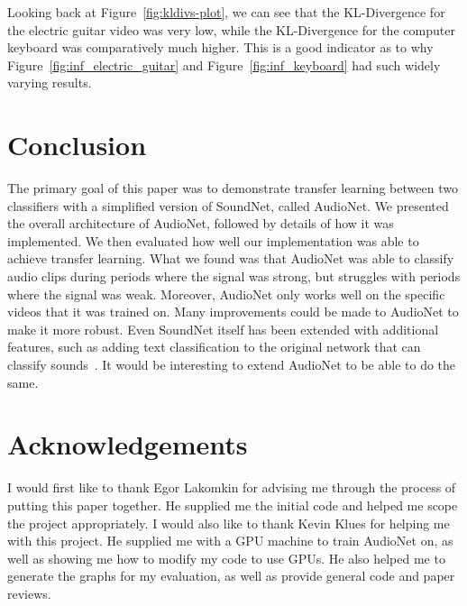 \documentclass[12pt,twoside]{article}
\theoremstyle{plain}
\theoremstyle{definition}
\theoremstyle{remark}
\begin{document}
Looking back at Figure~\ref{fig:kldivs-plot}, we can see that the KL-Divergence for the electric guitar video was very low, while the KL-Divergence for the computer keyboard was comparatively much higher.
This is a good indicator as to why Figure~\ref{fig:inf_electric_guitar} and Figure~\ref{fig:inf_keyboard} had such widely varying results.


\section{Conclusion}
\label{sec:conclusion}
The primary goal of this paper was to demonstrate transfer learning between two classifiers with a simplified version of SoundNet, called AudioNet.
We presented the overall architecture of AudioNet, followed by details of how it was implemented.
We then evaluated how well our implementation was able to achieve transfer learning.
What we found was that AudioNet was able to classify audio clips during periods where the signal was strong, but struggles with periods where the signal was weak.
Moreover, AudioNet only works well on the specific videos that it was trained on.
Many improvements could be made to AudioNet to make it more robust.
Even SoundNet itself has been extended with additional features, such as adding text classification to the original network that can classify sounds~\cite{Aytar:Yusuf:17}.
It would be interesting to extend AudioNet to be able to do the same.


\newpage
\appendix
\section{Acknowledgements}
\label{sec:acknowledgements}
I would first like to thank Egor Lakomkin for advising me through the process of putting this paper together.
He supplied me the initial code and helped me scope the project appropriately.
I would also like to thank Kevin Klues for helping me with this project.
He supplied me with a GPU machine to train AudioNet on, as well as showing me how to modify my code to use GPUs.
He also helped me to generate the graphs for my evaluation, as well as provide general code and paper reviews.

\end{document}
